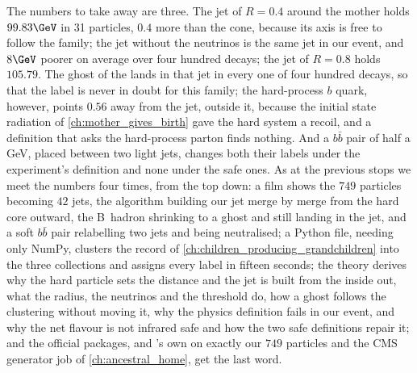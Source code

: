 The numbers to take away are three. The \antikt jet of $R=0.4$ around the
mother holds $99.83\GeV$ in 31 particles, $0.4$ more than the cone,
because its axis is free to follow the family; the jet without the
neutrinos is the same jet in our event, and $8\GeV$ poorer on average over
four hundred decays; the jet of $R=0.8$ holds $105.79$. The ghost of the
\Bbar lands in that jet in every one of four hundred decays, so that the
label is never in doubt for this family; the hard-process $b$ quark,
however, points $0.56$ away from the jet, outside it, because the initial
state radiation of \cref{ch:mother_gives_birth} gave the hard system a
recoil, and a definition that asks the hard-process parton finds nothing.
And a $b\bar b$ pair of half a GeV, placed between two light jets, changes
both their labels under the experiment's definition and none under
the safe ones. As at the previous stops we meet the
numbers four times, from the top down: a film shows the $749$ particles
becoming $42$ jets, the \antikt algorithm building our jet merge by merge
from the hard core outward, the B~hadron shrinking to a ghost and still
landing in the jet, and a soft $b\bar b$ pair relabelling two jets and
being neutralised; a Python file, needing only NumPy, clusters the record
of \cref{ch:children_producing_grandchildren} into the three \CMSSW
collections and assigns every label in fifteen seconds; the theory
derives why the hard particle sets the distance and the jet is built from
the inside out, what the radius, the neutrinos and the threshold do, how a
ghost follows the clustering without moving it, why the physics
definition fails in our event, and why the net flavour is not infrared
safe and how the two safe definitions repair it; and the official
packages, \FASTJET and \PYTHIA's own  on exactly our $749$
particles and the CMS generator job of \cref{ch:ancestral_home}, get the
last word.

